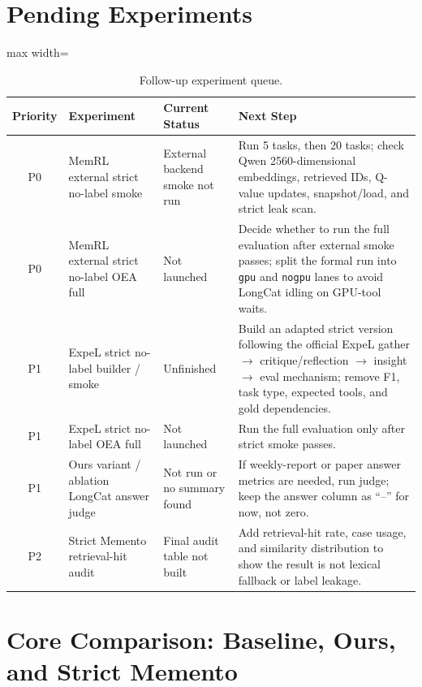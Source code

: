 \documentclass[11pt]{article}
\begin{document}
\section{Pending Experiments}

\begin{table}[h]
\centering
\caption{Follow-up experiment queue.}
\scriptsize
\begin{adjustbox}{max width=\textwidth}
\begin{tabular}{clll}
\toprule
\textbf{Priority} & \textbf{Experiment} & \textbf{Current Status} & \textbf{Next Step} \\
\midrule
P0 & MemRL external strict no-label smoke & External backend smoke not run & Run 5 tasks, then 20 tasks; check Qwen 2560-dimensional embeddings, retrieved IDs, Q-value updates, snapshot/load, and strict leak scan. \\
P0 & MemRL external strict no-label OEA full & Not launched & Decide whether to run the full evaluation after external smoke passes; split the formal run into \texttt{gpu} and \texttt{nogpu} lanes to avoid LongCat idling on GPU-tool waits. \\
P1 & ExpeL strict no-label builder / smoke & Unfinished & Build an adapted strict version following the official ExpeL gather $\rightarrow$ critique/reflection $\rightarrow$ insight $\rightarrow$ eval mechanism; remove F1, task type, expected tools, and gold dependencies. \\
P1 & ExpeL strict no-label OEA full & Not launched & Run the full evaluation only after strict smoke passes. \\
P1 & Ours variant / ablation LongCat answer judge & Not run or no summary found & If weekly-report or paper answer metrics are needed, run judge; keep the answer column as ``--'' for now, not zero. \\
P2 & Strict Memento retrieval-hit audit & Final audit table not built & Add retrieval-hit rate, case usage, and similarity distribution to show the result is not lexical fallback or label leakage. \\
\bottomrule
\end{tabular}
\end{adjustbox}
\end{table}

\section{Core Comparison: Baseline, Ours, and Strict Memento}
\end{document}
